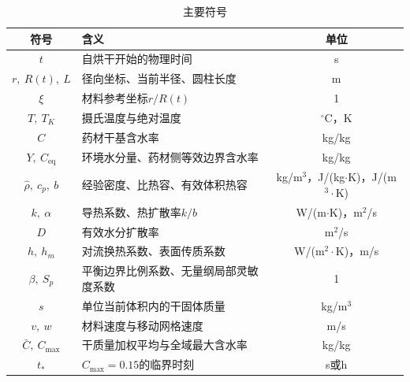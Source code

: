 \begin{table}[htbp]
  \caption{主要符号}
  \label{tab:symbols}
  \centering
  \begin{tabularx}{0.96\textwidth}{cXc}
    \toprule
    符号 & 含义 & 单位 \\
    \midrule
    $t$ & 自烘干开始的物理时间 & s \\
    $r,\ R(t),\ L$ & 径向坐标、当前半径、圆柱长度 & m \\
    $\xi$ & 材料参考坐标$r/R(t)$ & 1 \\
    $T,\ T_K$ & 摄氏温度与绝对温度 & $^\circ$C，K \\
    $C$ & 药材干基含水率 & kg/kg \\
    $Y,\ C_{\mathrm{eq}}$ & 环境水分量、药材侧等效边界含水率 & kg/kg \\
    $\hat\rho,\ c_p,\ b$ & 经验密度、比热容、有效体积热容 & kg/m$^3$，J/(kg$\cdot$K)，J/(m$^3\cdot$K) \\
    $k,\ \alpha$ & 导热系数、热扩散率$k/b$ & W/(m$\cdot$K)，m$^2$/s \\
    $D$ & 有效水分扩散率 & m$^2$/s \\
    $h,\ h_m$ & 对流换热系数、表面传质系数 & W/(m$^2\cdot$K)，m/s \\
    $\beta,\ S_p$ & 平衡边界比例系数、无量纲局部灵敏度系数 & 1 \\
    $s$ & 单位当前体积内的干固体质量 & kg/m$^3$ \\
    $v,\ w$ & 材料速度与移动网格速度 & m/s \\
    $\bar C,\ C_{\max}$ & 干质量加权平均与全域最大含水率 & kg/kg \\
    $t_*$ & $C_{\max}=0.15$的临界时刻 & s或h \\
    \bottomrule
  \end{tabularx}
\end{table}
